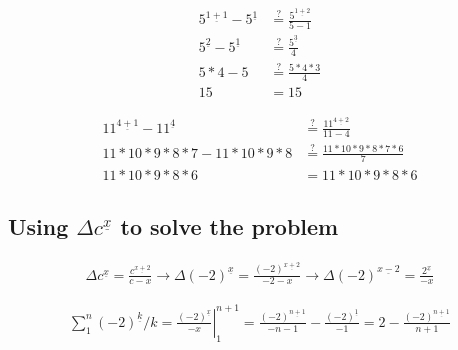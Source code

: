 \documentclass{article}
\begin{document}
 \begin{align*}
    5^{\underline{1+1}} - 5^{\underline{1}} &\stackrel{?}{=}
    \frac{5^{\underline{1+2}}}{5 - 1} \\
    5^{\underline{2}} - 5^{\underline{1}} &\stackrel{?}{=}
    \frac{5^{\underline{3}}}{4} \\
    5 * 4 - 5 &\stackrel{?}{=}
    \frac{5 * 4 * 3}{4} \\
    15 &= 15
 \end{align*}

 \begin{align*}
    11^{\underline{4+1}} - 11^{\underline{4}} &\stackrel{?}{=}
    \frac{11^{\underline{4 + 2}}}{11 - 4} \\
    11 * 10 * 9 * 8 * 7 - 11 * 10 * 9 * 8
    &\stackrel{?}{=} \frac{11 * 10 * 9 * 8 * 7 * 6}{ 7 } \\
    11 * 10 * 9 * 8 * 6
    &= 11 * 10 * 9 * 8 * 6
 \end{align*}

 \subsection*{Using $\Delta c^{\underline{x}}$ to solve the problem}

\begin{align*}
    \Delta c^{\underline{x}} = \frac{c^{\underline{x+2}}}{c - x}
    \rightarrow
    \Delta (-2)^{\underline{x}} = \frac{(-2)^{\underline{x+2}}}{-2 - x}
    \rightarrow
    \Delta (-2)^{\underline{x-2}} = \frac{2^{\underline{x}}}{-x}
\end{align*}

\begin{align*}
    \sum_1^n (-2)^{\underline{k}}/k
    = \left. \frac{(-2)^{\underline{x}}}{-x} \right|_1^{n+1}
    = \frac{(-2)^{\underline{n + 1}}}{-n - 1} 
    - \frac{(-2)^{\underline{1}}}{-1}
    = 2 - \frac{(-2)^{\underline{n+1}}}{n + 1}
\end{align*}
\end{document}
